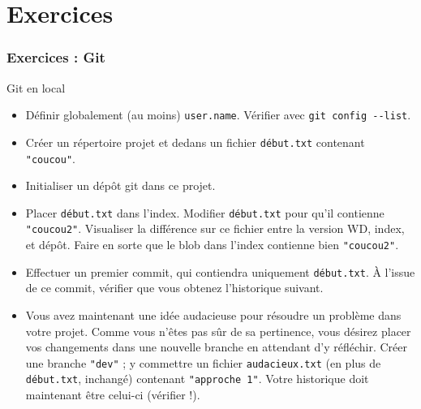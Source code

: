 \documentclass[english, french]{beamer}
\begin{document}
\section{Exercices}
\begin{frame}[allowframebreaks]
	\small
	\frametitle{Exercices : Git}
	Git en local
	\begin{itemize}
		\item Définir globalement (au moins) \texttt{user.name}. Vérifier avec \texttt{git config -{}-list}.
		\item Créer un répertoire projet et dedans un fichier \texttt{début.txt} contenant \texttt{"coucou"}.
		\item Initialiser un dépôt git dans ce projet.
		\item Placer \texttt{début.txt} dans l’index. Modifier \texttt{début.txt} pour qu’il contienne \texttt{"coucou2"}. Visualiser la différence sur ce fichier entre la version WD, index, et dépôt. Faire en sorte que le blob dans l’index contienne bien \texttt{"coucou2"}.
		\item Effectuer un premier commit, qui contiendra uniquement \texttt{début.txt}. À l’issue de ce commit, vérifier que vous obtenez l’historique suivant.\par
		{
			\centering
			\par
		}
		\item Vous avez maintenant une idée audacieuse pour résoudre un problème dans votre projet. Comme vous n’êtes pas sûr de sa pertinence, vous désirez placer vos changements dans une nouvelle branche en attendant d’y réfléchir. Créer une branche \texttt{"dev"} ; y commettre un fichier \texttt{audacieux.txt} (en plus de \texttt{début.txt}, inchangé) contenant \texttt{"approche 1"}. Votre historique doit maintenant être celui-ci (vérifier !).\par
		{
			\centering
			}
\end{itemize}
\end{frame}
\end{document}
